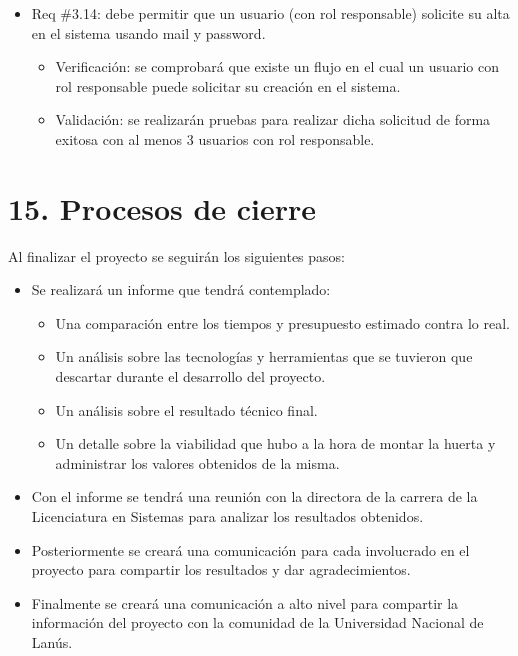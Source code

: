 \documentclass[
11pt, %
codirector, %
]{charter}
\begin{document}
\begin{itemize}
\begin{itemize}
	\item Req \#3.14: debe permitir que un usuario (con rol responsable) solicite su alta en el sistema usando mail y password.
		\begin{itemize}
		\item Verificación: se comprobará que existe un flujo en el cual un usuario con rol responsable puede solicitar su creación en el sistema.
		\item Validación: se realizarán pruebas para realizar dicha solicitud de forma exitosa con al menos 3 usuarios con rol responsable.
		\end{itemize}
		
\end{itemize}
\end{itemize}

\section{15. Procesos de cierre}    
\label{sec:cierre}

Al finalizar el proyecto se seguirán los siguientes pasos:

\begin{itemize}
	\item Se realizará un informe que tendrá contemplado:
	\begin{itemize}
		\item Una comparación entre los tiempos y presupuesto estimado contra lo real.
		\item Un análisis sobre las tecnologías y herramientas que se tuvieron que descartar durante el desarrollo del proyecto.
		\item Un análisis sobre el resultado técnico final.
		\item Un detalle sobre la viabilidad que hubo a la hora de montar la huerta y administrar los valores obtenidos de la misma.
	\end{itemize}
	\item Con el informe se tendrá una reunión con la directora de la carrera de la Licenciatura en Sistemas para analizar los resultados obtenidos.
	\item Posteriormente se creará una comunicación para cada involucrado en el proyecto para compartir los resultados y dar agradecimientos.
	\item Finalmente se creará una comunicación a alto nivel para compartir la información del proyecto con la comunidad de la Universidad Nacional de Lanús.
\end{itemize}
\end{document}

